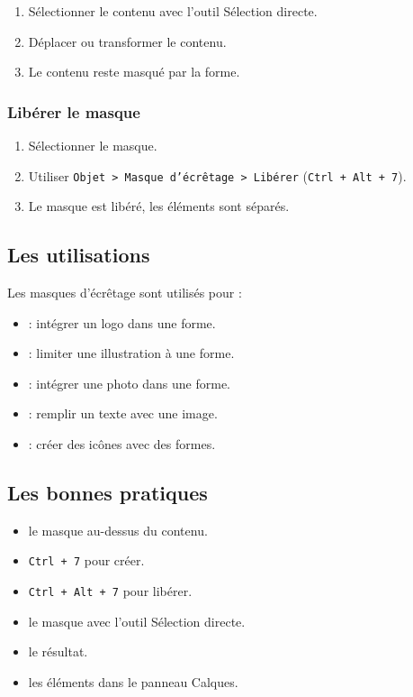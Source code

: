 \begin{enumerate}
    \item Sélectionner le contenu avec l'outil Sélection directe.
    \item Déplacer ou transformer le contenu.
    \item Le contenu reste masqué par la forme.
\end{enumerate}

\subsubsection{Libérer le masque}

\begin{enumerate}
    \item Sélectionner le masque.
    \item Utiliser \texttt{Objet > Masque d'écrêtage > Libérer} (\texttt{Ctrl + Alt + 7}).
    \item Le masque est libéré, les éléments sont séparés.
\end{enumerate}

\subsection{Les utilisations}

Les masques d'écrêtage sont utilisés pour :

\begin{itemize}
    \item {} : intégrer un logo dans une forme.
    \item {} : limiter une illustration à une forme.
    \item {} : intégrer une photo dans une forme.
    \item {} : remplir un texte avec une image.
    \item {} : créer des icônes avec des formes.
\end{itemize}

\subsection{Les bonnes pratiques}

\begin{itemize}
    \item {} le masque au-dessus du contenu.
    \item {} \texttt{Ctrl + 7} pour créer.
    \item {} \texttt{Ctrl + Alt + 7} pour libérer.
    \item {} le masque avec l'outil Sélection directe.
    \item {} le résultat.
    \item {} les éléments dans le panneau Calques.
\end{itemize}

